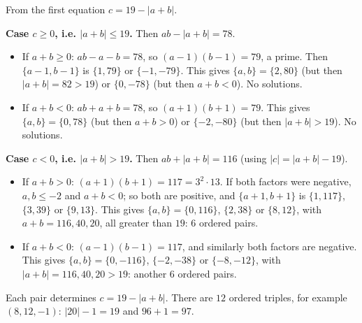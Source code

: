 From the first equation $c=19-|a+b|$.

\textbf{Case $c\ge0$, i.e. $|a+b|\le19$.} Then $ab-|a+b|=78$.
\begin{itemize}
\item If $a+b\ge0$: $ab-a-b=78$, so $(a-1)(b-1)=79$, a prime. Then $\{a-1,b-1\}$ is $\{1,79\}$ or $\{-1,-79\}$. This gives $\{a,b\}=\{2,80\}$ (but then $|a+b|=82>19$) or $\{0,-78\}$ (but then $a+b<0$). No solutions.
\item If $a+b<0$: $ab+a+b=78$, so $(a+1)(b+1)=79$. This gives $\{a,b\}=\{0,78\}$ (but then $a+b>0$) or $\{-2,-80\}$ (but then $|a+b|>19$). No solutions.
\end{itemize}

\textbf{Case $c<0$, i.e. $|a+b|>19$.} Then $ab+|a+b|=116$ (using $|c|=|a+b|-19$).
\begin{itemize}
\item If $a+b>0$: $(a+1)(b+1)=117=3^2\cdot13$. If both factors were negative, $a,b\le-2$ and $a+b<0$; so both are positive, and $\{a+1,b+1\}$ is $\{1,117\}$, $\{3,39\}$ or $\{9,13\}$. This gives $\{a,b\}=\{0,116\}$, $\{2,38\}$ or $\{8,12\}$, with $a+b=116,40,20$, all greater than $19$: $6$ ordered pairs.
\item If $a+b<0$: $(a-1)(b-1)=117$, and similarly both factors are negative. This gives $\{a,b\}=\{0,-116\}$, $\{-2,-38\}$ or $\{-8,-12\}$, with $|a+b|=116,40,20>19$: another $6$ ordered pairs.
\end{itemize}
Each pair determines $c=19-|a+b|$. There are $\boxed{12}$ ordered triples, for example $(8,12,-1)$: $|20|-1=19$ and $96+1=97$.
